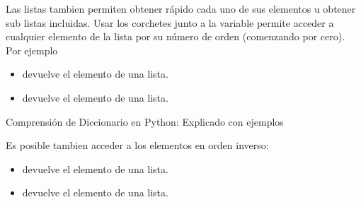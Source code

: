 \documentclass[a4paper,12pt,spanish]{sphinxmanual}
\begin{document}
\sphinxAtStartPar
Las listas tambien permiten obtener rápido cada uno de sus elementos u
obtener sub listas incluidas.
Usar los corchetes junto a la variable permite acceder a cualquier elemento
de la lista por su número de orden (comenzando por cero).
Por ejemplo
\begin{itemize}
\item {} 
\sphinxAtStartPar
{} devuelve el  elemento de una lista.

\item {} 
\sphinxAtStartPar
{} devuelve el  elemento de una lista.

\end{itemize}

\sphinxAtStartPar
{}

\sphinxAtStartPar
Comprensión de Diccionario en Python: Explicado con ejemplos

\sphinxAtStartPar
Es posible tambien acceder a los elementos en orden inverso:
\begin{itemize}
\item {} 
\sphinxAtStartPar
{} devuelve el  elemento de una lista.

\item {} 
\sphinxAtStartPar
{} devuelve el  elemento de una lista.

\end{itemize}
\end{document}
